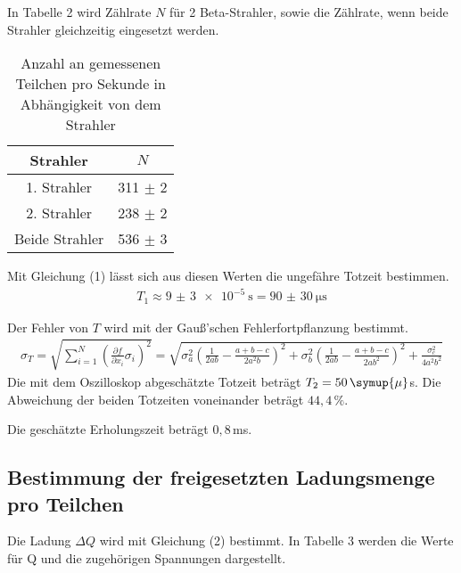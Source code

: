 In Tabelle 2 wird Zählrate $N$ für 2 Beta-Strahler, sowie die Zählrate, wenn beide Strahler gleichzeitig
eingesetzt werden.

\begin{table}[H]
  \centering
  \caption{Anzahl an gemessenen Teilchen pro Sekunde in Abhängigkeit von dem Strahler}
  \label{tab:Rechteckspannung}
  \begin{tabular}{c c}
    \toprule
    Strahler & $N$  \\
    \midrule
    1. Strahler & 311 $\pm$ 2 \\
    2. Strahler & 238 $\pm$ 2\\
    Beide Strahler & 536 $\pm$ 3\\
    \bottomrule
  \end{tabular}
\end{table}

Mit Gleichung (1) lässt sich aus diesen Werten die ungefähre Totzeit bestimmen.
\begin{align*}
  T_1 \approx \SI{9(3)e-5}{\second} = \SI{90(30)}{\micro\second}
\end{align*}

Der Fehler von $T$ wird mit der Gauß'schen Fehlerfortpflanzung bestimmt.
\begin{align*}
  \sigma_T = \sqrt{
      \sum\limits_{i = 1}^N
       \left( \frac{\partial f}{\partial x_i} \sigma_i \right)^{\!\! 2}
     }
    = \sqrt{\sigma_{a}^{2} \left(\frac{1}{2 a b} - \frac{a + b - c}{2 a^{2} b}\right)^{2}
  + \sigma_{b}^{2} \left(\frac{1}{2 a b} - \frac{a + b - c}{2 a b^{2}}\right)^{2} + \frac{\sigma_{c}^{2}}{4 a^{2} b^{2}}}
\end{align*}
Die mit dem Oszilloskop abgeschätzte Totzeit beträgt $T_2 = 50 \, \symup{\mu} $s.
Die Abweichung der beiden Totzeiten voneinander beträgt $44,4 \, \%$.

Die geschätzte Erholungszeit beträgt $0,8 \,$ms.


\subsection{Bestimmung der freigesetzten Ladungsmenge pro Teilchen}

Die Ladung $\Delta Q$ wird mit Gleichung (2) bestimmt. In Tabelle 3 werden die Werte für Q und die zugehörigen Spannungen dargestellt.

